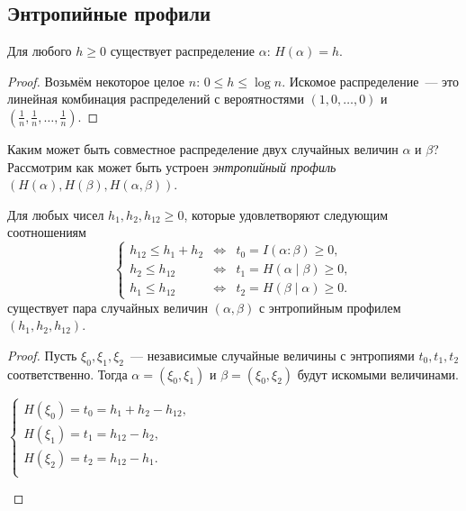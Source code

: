 \documentclass[12pt]{article}
\begin{document}
\subsection{Энтропийные профили}
\begin{statement}
    Для любого $h\ge 0$ существует распределение $\alpha$: $H(\alpha) = h$. 
\end{statement}
\begin{proof}
    Возьмём некоторое целое $n$: $0\le h\le\log n$. Искомое распределение~---
    это линейная комбинация распределений с вероятностями $(1, 0, \dotsc, 0)$
    и $(\frac1n, \frac1n,\dotsc,\frac1n)$.
\end{proof}

Каким может быть совместное распределение двух случайных величин
$\alpha$ и $\beta$? Рассмотрим как может быть устроен \emph{энтропийный
профиль} $(H(\alpha), H(\beta), H(\alpha,\beta))$. 

\begin{statement}
    Для любых чисел $h_1, h_2, h_{12}\ge 0$, которые удовлетворяют следующим
    соотношениям
\[
    \left\{
    \begin{array}{lll}
        h_{12} \le h_1 + h_2 & \iff & t_0 = I(\alpha:\beta)\ge 0,\\
        h_{2} \le h_{12}     & \iff & t_1 = H(\alpha\mid\beta)\ge 0,\\
        h_{1} \le h_{12}     & \iff & t_2 = H(\beta\mid\alpha)\ge 0.
    \end{array}
    \right.
\]
    существует пара случайных величин $(\alpha,\beta)$ с энтропийным профилем $(h_1, h_2, h_{12})$.
\end{statement}
\begin{proof}
    Пусть $\xi_0,\xi_1,\xi_2$~--- независимые случайные величины с энтропиями
    $t_0,t_1,t_2$ соответственно. Тогда $\alpha=(\xi_0,\xi_1)$ и
    $\beta=(\xi_0,\xi_2)$ будут искомыми величинами.  
    \begin{center}
    
        \parbox{.4\textwidth}{
        \(
        \begin{cases}
            H(\xi_0) = t_0 = h_1 + h_2 - h_{12},\\
            H(\xi_1) = t_1 = h_{12} - h_{2},\\
            H(\xi_2) = t_2 = h_{12} - h_{1}.\\
        \end{cases}
        \)}
    \parbox{.4\textwidth}{}
    \end{center}
\end{proof}
\end{document}

